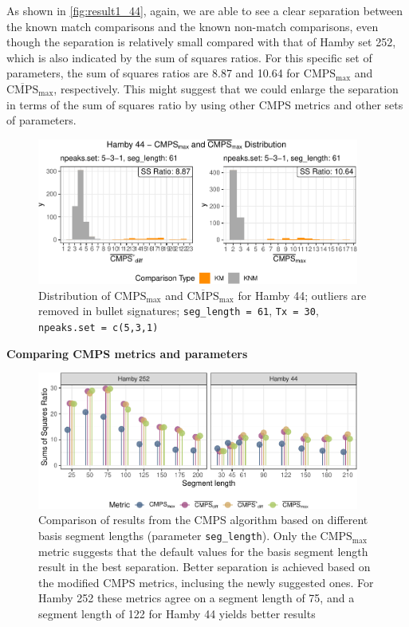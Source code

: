 As shown in \autoref{fig:result1_44}, again, we are able to see a clear
separation between the known match comparisons and the known non-match
comparisons, even though the separation is relatively small compared
with that of Hamby set 252, which is also indicated by the sum of
squares ratios. For this specific set of parameters, the sum of squares
ratios are 8.87 and 10.64 for \(\mathrm{CMPS_{max}}\) and
\(\mathrm{\overline{CMPS}_{max}}\), respectively. This might suggest
that we could enlarge the separation in terms of the sum of squares
ratio by using other CMPS metrics and other sets of parameters.

\begin{Schunk}
\begin{figure}

{\centering \includegraphics[width=400px]{ju-hofmann_files/figure-latex/result1_44-1} 

}

\caption{Distribution of $\mathrm{CMPS_{max}}$ and $\mathrm{\overline{CMPS}_{max}}$ for Hamby 44; outliers are removed in bullet signatures; \texttt{seg\_length = 61}, \texttt{Tx = 30}, \texttt{npeaks.set = c(5,3,1)} }\label{fig:result1_44}
\end{figure}
\end{Schunk}

\textbf{Comparing CMPS metrics and parameters}

\begin{Schunk}
\begin{figure}

{\centering \includegraphics[width=400px]{ju-hofmann_files/figure-latex/param_seg_plot-1} 

}

\caption{Comparison of results from the CMPS algorithm based on different basis segment lengths (parameter \texttt{seg\_length}). Only the $\mathrm{CMPS_{max}}$ metric suggests that the default values for the basis segment length result in the best separation. Better separation is achieved based on the modified CMPS metrics, inclusing the newly suggested ones. For Hamby 252 these metrics agree on a segment length of 75, and a segment length of 122 for Hamby 44 yields better results}\label{fig:param_seg_plot}
\end{figure}
\end{Schunk}

